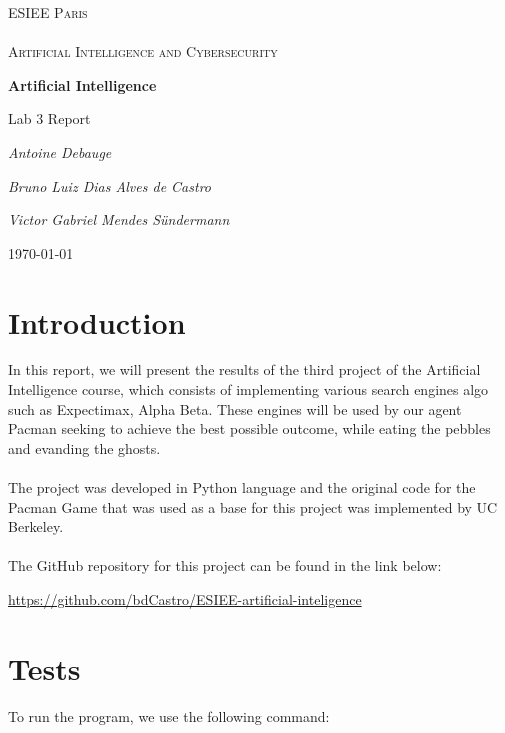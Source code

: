 \documentclass{article}
\begin{document}
\begin{titlepage}
\centering
{\textsc{\Large ESIEE Paris \\ ~\\ Artificial Intelligence and Cybersecurity} \par}
\vfill
{\huge\bfseries Artificial Intelligence \par}
\vspace{0.5cm}
{\LARGE Lab 3 Report \par}
\vspace{2cm}
{\Large\itshape Antoine Debauge \par}
{\Large\itshape Bruno Luiz Dias Alves de Castro \par}
{\Large\itshape Victor Gabriel Mendes Sündermann \par}
\vfill

{\large \today\par}
\end{titlepage}

\pagebreak
\tableofcontents
\pagebreak

\section{Introduction}

In this report, we will present the results of the third project of the Artificial Intelligence course, which consists of implementing various search engines algo such as Expectimax, Alpha Beta.
These engines will be used by our agent Pacman seeking to achieve the best possible outcome, while eating the pebbles and evanding the ghosts.
\\~\\
The project was developed in Python language and the original code for the Pacman Game that was used as a base for this project was implemented by UC Berkeley.
\\~\\
The GitHub repository for this project can be found in the link below:

\begin{center}
  \url{https://github.com/bdCastro/ESIEE-artificial-inteligence}
\end{center}

\section{Tests}
To run the program, we use the following command:
\end{document}
